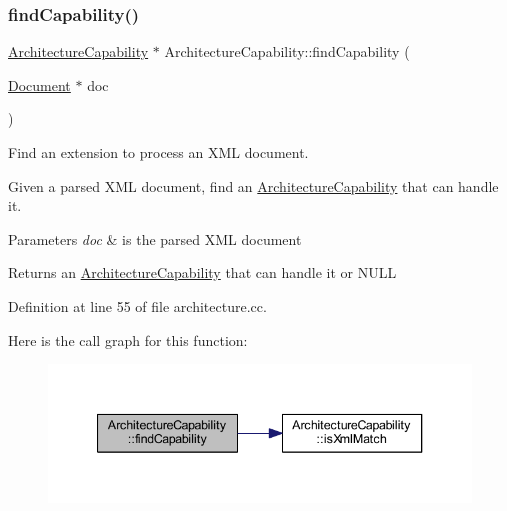 \subsubsection{\texorpdfstring{findCapability()}{findCapability()}\hspace{0.1cm}{\footnotesize\ttfamily [2/2]}}
{\footnotesize\ttfamily \mbox{\hyperlink{class_architecture_capability}{Architecture\+Capability}} $\ast$ Architecture\+Capability\+::find\+Capability (\begin{DoxyParamCaption}\item[{\mbox{\hyperlink{class_document}{Document}} $\ast$}]{doc }\end{DoxyParamCaption})\hspace{0.3cm}{\ttfamily [static]}}



Find an extension to process an X\+ML document. 

Given a parsed X\+ML document, find an \mbox{\hyperlink{class_architecture_capability}{Architecture\+Capability}} that can handle it. 
\begin{DoxyParams}{Parameters}
{\em doc} & is the parsed X\+ML document \\
\hline
\end{DoxyParams}
\begin{DoxyReturn}{Returns}
an \mbox{\hyperlink{class_architecture_capability}{Architecture\+Capability}} that can handle it or N\+U\+LL 
\end{DoxyReturn}


Definition at line 55 of file architecture.\+cc.

Here is the call graph for this function\+:
\nopagebreak
\begin{figure}[H]
\begin{center}
\leavevmode
\includegraphics[width=340pt]{class_architecture_capability_ac85f63c6e2e12e2f37f239cd5399ad42_cgraph}
\end{center}
\end{figure}
\mbox{\label{class_architecture_capability_acac89caf4ab91f7ff041d6b24e7b3ffc}} 
